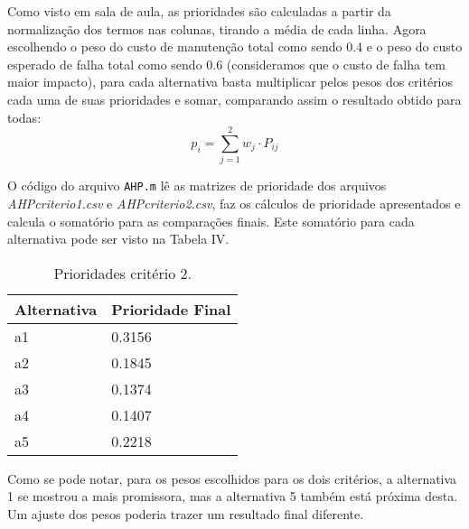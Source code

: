 Como visto em sala de aula, as prioridades são calculadas a partir da normalização dos termos nas colunas, tirando a média de cada linha. Agora escolhendo o peso do custo de manutenção total como sendo 0.4 e o peso do custo esperado de falha total como sendo 0.6 (consideramos que o custo de falha tem maior impacto), para cada alternativa basta multiplicar pelos pesos dos critérios cada uma de suas prioridades e somar, comparando assim o resultado obtido para todas:
\begin{equation}
p_i = \sum_{j=1}^{2} w_j \cdot P_{ij}
\end{equation}

O código do arquivo \texttt{AHP.m} lê as matrizes de prioridade dos arquivos \textit{AHPcriterio1.csv} e \textit{AHPcriterio2.csv}, faz os cálculos de prioridade apresentados e calcula o somatório para as comparações finais. Este somatório para cada alternativa pode ser visto na Tabela IV.
\begin{table}[h]
	\centering
	\begin{tabular}{ | l | l | }
		\hline
		Alternativa & Prioridade Final \\ \hline
		a1 & 0.3156 \\ \hline
		a2 & 0.1845 \\ \hline
		a3 & 0.1374 \\ \hline
		a4 & 0.1407 \\ \hline
		a5 & 0.2218 \\ \hline
	\end{tabular}
	\label{table:ahp-result}
	\caption{Prioridades critério 2.}
\end{table}

\newpage

Como se pode notar, para os pesos escolhidos para os dois critérios, a alternativa 1 se mostrou a mais promissora, mas a alternativa 5 também está próxima desta. Um ajuste dos pesos poderia trazer um resultado final diferente.